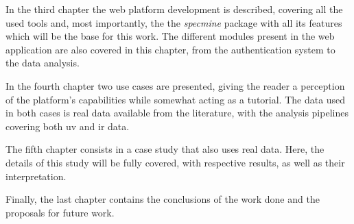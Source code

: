In the third chapter the web platform development is described, covering all the used tools and, most importantly, the the \textit{specmine} package with all its features which will be the base for this work. The different modules present in the web application are also covered in this chapter, from the authentication system to the data analysis.

In the fourth chapter two use cases are presented, giving the reader a perception of the platform's capabilities while somewhat acting as a tutorial. The data used in both cases is real data available from the literature, with the analysis pipelines covering both \gls{uv} and \gls{ir} data. 

The fifth chapter consists in a case study that also uses real data. Here, the details of this study will be fully covered, with respective results, as well as their interpretation.

Finally, the last chapter contains the conclusions of the work done and the proposals for future work.



